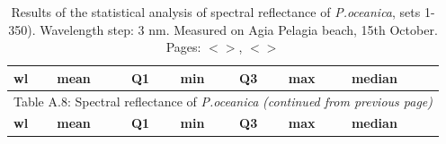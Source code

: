 \documentclass[11pt]{article}
\begin{document}
\begin{appendices}
\begin{table}[htbp]
\end{table}
\pagebreak

\begin{longtable}{|c|c|c|c|c|c|c|}
	\caption{Results of the statistical analysis of spectral reflectance of \textit{P.oceanica}, sets 1-350). Wavelength step: 3 nm. Measured on Agia Pelagia beach, 15th October. Pages: $<$\pageref{page-28}$>$, $<$\pageref{page-40}$>$}\label{tab:A.8} \\
	  \multicolumn{1}{|l|}{\textbf{wl}} &
	   \multicolumn{1}{l|}{\textbf{mean}} & 
	   \multicolumn{1}{l|}{\textbf{Q1}} & 
	   \multicolumn{1}{l|}{\textbf{min}} & 
	   \multicolumn{1}{l|}{\textbf{Q3}} & 
	   \multicolumn{1}{l|}{\textbf{max}} & 
	   \multicolumn{1}{l|}{\textbf{median}} \\ \hline
	\endfirsthead

	\multicolumn{7}{c}{Table A.8: Spectral reflectance of \textit{P.oceanica} \textit{(continued from previous page)}}\\
	\hline \multicolumn{1}{|l|}{\textbf{wl}} & \multicolumn{1}{l|}{\textbf{mean}} & \multicolumn{1}{l|}{\textbf{Q1}} & \multicolumn{1}{l|}{\textbf{min}} & \multicolumn{1}{l|}{\textbf{Q3}} & \multicolumn{1}{l|}{\textbf{max}} & \multicolumn{1}{l|}{\textbf{median}} \\ \hline
	\endhead


\end{longtable}
\end{appendices}
\end{document}
